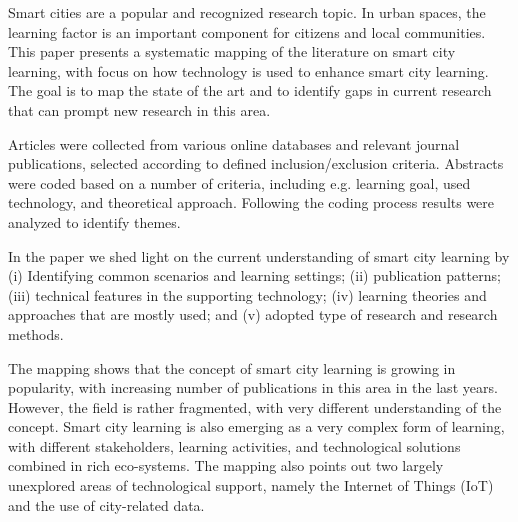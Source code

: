 Smart cities are a popular and recognized research topic. In urban spaces, the learning factor is an important component for citizens and local communities. This paper presents a systematic mapping of the literature on smart city learning, with focus on how technology is used to enhance smart city learning.
The goal is to map the state of the art and to identify gaps in current research that can prompt new research in this area.

Articles were collected from various online databases and relevant journal publications, selected according to defined inclusion/exclusion criteria. Abstracts were coded based on a number of criteria, including e.g. learning goal, used technology, and theoretical approach. Following the coding process results were analyzed to identify themes. 

In the paper we shed light on the current understanding of smart city learning by (i) Identifying common scenarios and learning settings; (ii) publication patterns; (iii) technical features in the supporting technology; (iv) learning theories and approaches that are mostly used; and (v) adopted type of research and research methods.

The mapping shows that the concept of smart city learning is growing in popularity, with increasing number of publications in this area in the last years. However, the field is rather fragmented, with very different understanding of the concept.  Smart city learning is also emerging as a very complex form of learning, with different stakeholders, learning activities, and technological solutions combined in rich eco-systems. The mapping also points out two largely unexplored areas of technological support, namely the Internet of Things (IoT) and the use of city-related data.
